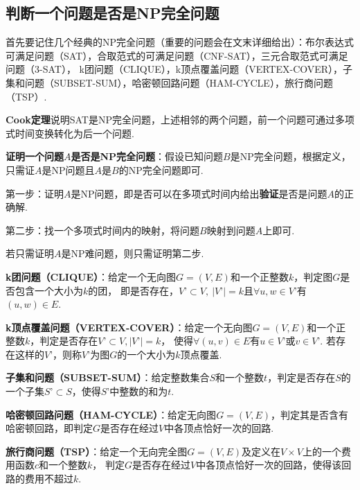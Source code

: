 \documentclass[12pt, a4paper, oneside]{ctexart}
\numberwithin{equation}{section}  %
\theoremstyle{definition}
\begin{document}
\subsection{判断一个问题是否是NP完全问题}
首先要记住几个经典的NP完全问题（重要的问题会在文末详细给出）：布尔表达式可满足问题（SAT），合取范式的可满足问题（CNF-SAT），三元合取范式可满足问题（3-SAT），
k团问题（CLIQUE），k顶点覆盖问题（VERTEX-COVER），子集和问题（SUBSET-SUM），哈密顿回路问题（HAM-CYCLE），旅行商问题（TSP）.

\textbf{Cook定理}说明SAT是NP完全问题，上述相邻的两个问题，前一个问题可通过多项式时间变换转化为后一个问题.

\textbf{证明一个问题$A$是否是NP完全问题}：假设已知问题$B$是NP完全问题，根据定义，只需证$A$是NP问题且$A$是$B$的NP完全问题即可. 

第一步：证明$A$是NP问题，即是否可以在多项式时间内给出\textbf{验证}是否是问题$A$的正确解.

第二步：找一个多项式时间内的映射，将问题$B$映射到问题$A$上即可.

若只需证明$A$是NP难问题，则只需证明第二步.

\textbf{k团问题（CLIQUE）}：给定一个无向图$G=(V,E)$和一个正整数$k$，判定图$G$是否包含一个大小为$k$的团，
即是否存在，$V’\subset V,\ |V’|=k$且$\forall u, w\in V’$有$(u,w)\in E$.

\textbf{k顶点覆盖问题（VERTEX-COVER）}：给定一个无向图$G=(V,E)$和一个正整数$k$，判定是否存在$V’\subset V, |V’|=k$，
使得$\forall (u,v)\in E$有$u\in V’$或$v\in V’$. 若存在这样的$V’$，则称$V’$为图$G$的一个大小为$k$顶点覆盖.

\textbf{子集和问题（SUBSET-SUM）}：给定整数集合$S$和一个整数$t$，判定是否存在$S$的一个子集$S’\subset S$，使得$S’$中整数的和为$t$.

\textbf{哈密顿回路问题（HAM-CYCLE）}：给定无向图$G=(V,E)$，判定其是否含有哈密顿回路，即判定$G$是否存在经过$V$中各顶点恰好一次的回路.

\textbf{旅行商问题（TSP）}：给定一个无向完全图$G=(V,E)$及定义在$V\times V$上的一个费用函数$c$和一个整数$k$，
判定$G$是否存在经过$V$中各顶点恰好一次的回路，使得该回路的费用不超过$k$.
\end{document}
